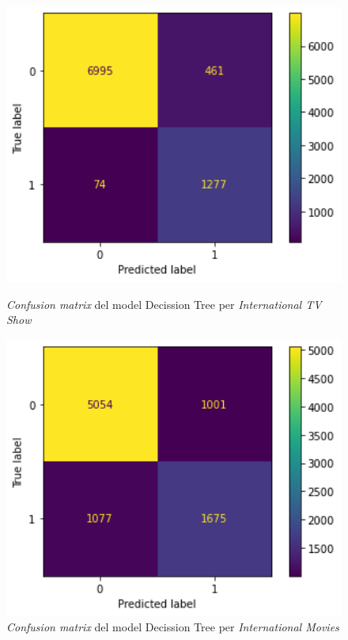 \documentclass[a4paper, 11pt]{article}
\begin{document}
\begin{figure}[h] %
\begin{minipage}{5cm} %
\begin{center}
    \includegraphics[width=1\textwidth]{ConfMatrix/CM_DT_InternationalTV.png}
    \caption{\textit{Confusion matrix} del model Decission Tree per \textit{International TV Show}}
    \includegraphics[width=1\textwidth]{ConfMatrix/CM_DT_InternationalMovies.png}
    \caption{\textit{Confusion matrix} del model Decission Tree per \textit{International Movies}}

\end{center}
\end{minipage}
\end{figure}
\end{document}
